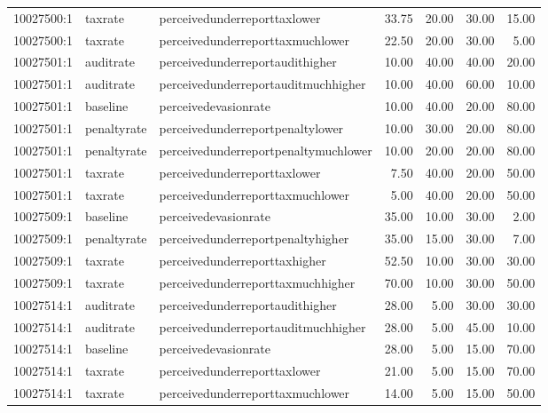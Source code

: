 \begin{table}[ht]
\begin{tabular}{lllrrrr}
  10027500:1 & taxrate & perceivedunderreporttaxlower & 33.75 & 20.00 & 30.00 & 15.00 \\ 
  10027500:1 & taxrate & perceivedunderreporttaxmuchlower & 22.50 & 20.00 & 30.00 & 5.00 \\ 
  10027501:1 & auditrate & perceivedunderreportaudithigher & 10.00 & 40.00 & 40.00 & 20.00 \\ 
  10027501:1 & auditrate & perceivedunderreportauditmuchhigher & 10.00 & 40.00 & 60.00 & 10.00 \\ 
  10027501:1 & baseline & perceivedevasionrate & 10.00 & 40.00 & 20.00 & 80.00 \\ 
  10027501:1 & penaltyrate & perceivedunderreportpenaltylower & 10.00 & 30.00 & 20.00 & 80.00 \\ 
  10027501:1 & penaltyrate & perceivedunderreportpenaltymuchlower & 10.00 & 20.00 & 20.00 & 80.00 \\ 
  10027501:1 & taxrate & perceivedunderreporttaxlower & 7.50 & 40.00 & 20.00 & 50.00 \\ 
  10027501:1 & taxrate & perceivedunderreporttaxmuchlower & 5.00 & 40.00 & 20.00 & 50.00 \\ 
  10027509:1 & baseline & perceivedevasionrate & 35.00 & 10.00 & 30.00 & 2.00 \\ 
  10027509:1 & penaltyrate & perceivedunderreportpenaltyhigher & 35.00 & 15.00 & 30.00 & 7.00 \\ 
  10027509:1 & taxrate & perceivedunderreporttaxhigher & 52.50 & 10.00 & 30.00 & 30.00 \\ 
  10027509:1 & taxrate & perceivedunderreporttaxmuchhigher & 70.00 & 10.00 & 30.00 & 50.00 \\ 
  10027514:1 & auditrate & perceivedunderreportaudithigher & 28.00 & 5.00 & 30.00 & 30.00 \\ 
  10027514:1 & auditrate & perceivedunderreportauditmuchhigher & 28.00 & 5.00 & 45.00 & 10.00 \\ 
  10027514:1 & baseline & perceivedevasionrate & 28.00 & 5.00 & 15.00 & 70.00 \\ 
  10027514:1 & taxrate & perceivedunderreporttaxlower & 21.00 & 5.00 & 15.00 & 70.00 \\ 
  10027514:1 & taxrate & perceivedunderreporttaxmuchlower & 14.00 & 5.00 & 15.00 & 50.00 \\ 
   \hline
\end{tabular}
\end{table}
